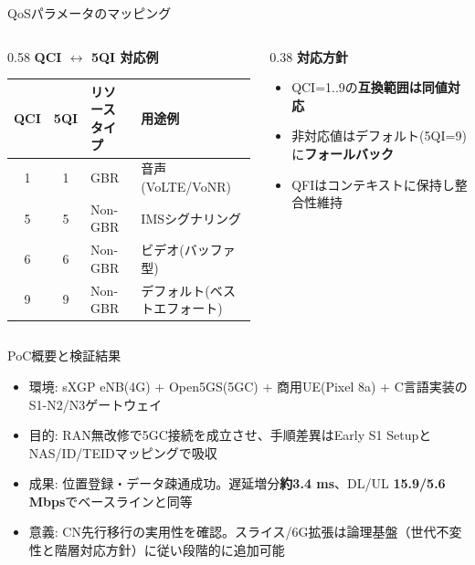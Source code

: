 \documentclass[dvipdfmx,11pt,aspectratio=169]{beamer}
\begin{document}
\begin{frame}{QoSパラメータのマッピング}
  \begin{columns}[T]
    \begin{column}{0.58\textwidth}
      \textbf{QCI $\leftrightarrow$ 5QI 対応例}
      \begin{table}
        \tiny
        \begin{tabular}{|c|c|l|l|}
          \hline
          QCI & 5QI & リソースタイプ & 用途例 \\
          \hline
          1 & 1 & GBR & 音声(VoLTE/VoNR) \\
          5 & 5 & Non-GBR & IMSシグナリング \\
          6 & 6 & Non-GBR & ビデオ(バッファ型) \\
          9 & 9 & Non-GBR & デフォルト(ベストエフォート) \\
          \hline
        \end{tabular}
      \end{table}
    \end{column}
    \begin{column}{0.38\textwidth}
      \textbf{対応方針}
      \begin{itemize}
        \item QCI=1..9の\textbf{互換範囲は同値対応}
        \item 非対応値はデフォルト(5QI=9)に\textbf{フォールバック}
        \item QFIはコンテキストに保持し整合性維持
      \end{itemize}
    \end{column}
  \end{columns}
\end{frame}

\fi

\begin{frame}{PoC概要と検証結果}
  \begin{itemize}
    \item 環境: sXGP eNB(4G) + Open5GS(5GC) + 商用UE(Pixel 8a) + C言語実装のS1-N2/N3ゲートウェイ
    \item 目的: \alert{RAN無改修}で5GC接続を成立させ、手順差異はEarly S1 SetupとNAS/ID/TEIDマッピングで吸収
    \item 成果: 位置登録・データ疎通成功。遅延増分\textbf{約3.4 ms}、DL/UL \textbf{15.9/5.6 Mbps}でベースラインと同等
    \item 意義: CN先行移行の実用性を確認。スライス/6G拡張は論理基盤（世代不変性と階層対応方針）に従い段階的に追加可能
  \end{itemize}
\end{frame}
\end{document}
